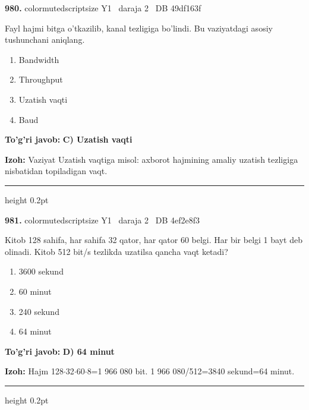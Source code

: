 \documentclass[10pt,a4paper,oneside]{article}
\begin{document}
\noindent\textbf{\color{ink}980.}  {color{muted}scriptsize Y1 \textbullet\ daraja 2 \textbullet\ DB 49df163f}
\par
Fayl hajmi bitga o'tkazilib, kanal tezligiga bo'lindi. Bu vaziyatdagi asosiy tushunchani aniqlang.
\begin{enumerate}[label=\Alph*),leftmargin=9mm]
\item Bandwidth
\item Throughput
\item Uzatish vaqti
\item Baud
\end{enumerate}
\begin{tcolorbox}[enhanced,breakable,colback=teal!4,colframe=teal!50!black,boxrule=0.5pt,arc=1.1mm,left=3mm,right=3mm,top=1.7mm,bottom=1.7mm,before skip=2mm,after skip=2mm]
\textbf{\color{teal}To'g'ri javob:} \textbf{C) Uzatish vaqti}
\par\smallskip
\textbf{Izoh:} Vaziyat Uzatish vaqtiga misol: axborot hajmining amaliy uzatish tezligiga nisbatidan topiladigan vaqt.
\end{tcolorbox}
\vspace{2mm}\hrule height 0.2pt \vspace{3mm}

\noindent\textbf{\color{ink}981.}  {color{muted}scriptsize Y1 \textbullet\ daraja 2 \textbullet\ DB 4ef2e8f3}
\par
Kitob 128 sahifa, har sahifa 32 qator, har qator 60 belgi. Har bir belgi 1 bayt deb olinadi. Kitob 512 bit/s tezlikda uzatilsa qancha vaqt ketadi?
\begin{enumerate}[label=\Alph*),leftmargin=9mm]
\item 3600 sekund
\item 60 minut
\item 240 sekund
\item 64 minut
\end{enumerate}
\begin{tcolorbox}[enhanced,breakable,colback=teal!4,colframe=teal!50!black,boxrule=0.5pt,arc=1.1mm,left=3mm,right=3mm,top=1.7mm,bottom=1.7mm,before skip=2mm,after skip=2mm]
\textbf{\color{teal}To'g'ri javob:} \textbf{D) 64 minut}
\par\smallskip
\textbf{Izoh:} Hajm 128\ensuremath{\cdot}32\ensuremath{\cdot}60\ensuremath{\cdot}8=1 966 080 bit. 1 966 080/512=3840 sekund=64 minut.
\end{tcolorbox}
\vspace{2mm}\hrule height 0.2pt \vspace{3mm}
\end{document}

